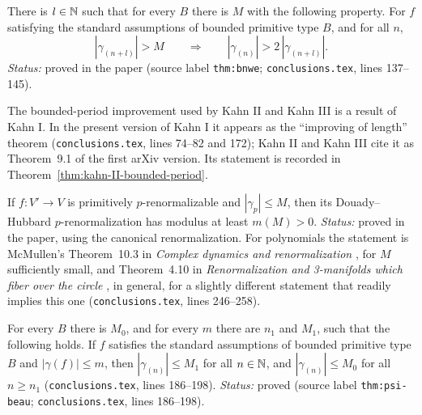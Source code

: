 \begin{theorem}
\label{thm:kahn-I-bnwe}
There is $l\in\mathbb N$ such that for every $B$ there is $M$ with the following property.  For
$f$ satisfying the standard assumptions of bounded primitive type $B$, and for all $n$,
\[
|\gamma_{(n+l)}|>M\qquad\Longrightarrow\qquad |\gamma_{(n)}|>2\,|\gamma_{(n+l)}|.
\]
\emph{Status:} proved in the paper (source label \texttt{thm:bnwe};
\texttt{conclusions.tex}, lines 137--145).
\end{theorem}

\begin{remark}
\label{rem:kahn-I-improving}
The bounded-period improvement used by Kahn II and Kahn III is a result of Kahn I.  In the
present version of Kahn I it appears as the ``improving of length'' theorem
(\texttt{conclusions.tex}, lines 74--82 and 172); Kahn II and Kahn III cite it as Theorem~9.1
of the first arXiv version.  Its statement is recorded in
Theorem~\ref{thm:kahn-II-bounded-period}.
\end{remark}

\begin{theorem}
\label{thm:kahn-I-geodesic-modulus}
If $f\colon V'\to V$ is primitively $p$-renormalizable and $|\gamma_p|\le M$, then its
Douady--Hubbard $p$-renormalization has modulus at least $m(M)>0$.  \emph{Status:} proved
in the paper, using the canonical renormalization.  For polynomials the statement is McMullen's Theorem~10.3 in
\emph{Complex dynamics and renormalization} \cite{McMullenCDR}, for $M$ sufficiently small, and Theorem~4.10 in
\emph{Renormalization and 3-manifolds which fiber over the circle} \cite{McMullenTowers}, in general, for a slightly
different statement that readily implies this one (\texttt{conclusions.tex}, lines 246--258).
\end{theorem}

\begin{theorem}
\label{thm:kahn-I-psi-beau}
For every $B$ there is $M_0$, and for every $m$ there are $n_1$ and $M_1$, such that the following holds.  If $f$
satisfies the standard assumptions of bounded primitive type $B$ and $|\gamma(f)|\le m$, then $|\gamma_{(n)}|\le M_1$
for all $n\in\mathbb N$, and $|\gamma_{(n)}|\le M_0$ for all $n\ge n_1$ (\texttt{conclusions.tex}, lines 186--198).
\emph{Status:} proved (source label \texttt{thm:psi-beau};
\texttt{conclusions.tex}, lines 186--198).
\end{theorem}

